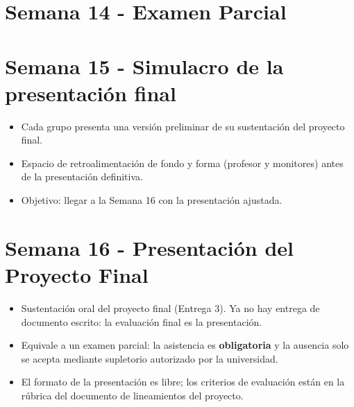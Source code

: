 \documentclass{article}
\begin{document}
\newpage
\section*{Semana 14 - Examen Parcial}

\newpage
\section*{Semana 15 - Simulacro de la presentación final}
\vspace{0.2 cm}

\begin{itemize}
  \item Cada grupo presenta una versión preliminar de su sustentación del proyecto final.
  \item Espacio de retroalimentación de fondo y forma (profesor y monitores) antes de la presentación definitiva.
  \item Objetivo: llegar a la Semana 16 con la presentación ajustada.
\end{itemize}

\newpage
\section*{Semana 16 - Presentación del Proyecto Final}
\vspace{0.2 cm}

\begin{itemize}
  \item Sustentación oral del proyecto final (Entrega 3). Ya no hay entrega de documento escrito: la evaluación final es la presentación.
  \item Equivale a un examen parcial: la asistencia es \textbf{obligatoria} y la ausencia solo se acepta mediante supletorio autorizado por la universidad.
  \item El formato de la presentación es libre; los criterios de evaluación están en la rúbrica del documento de lineamientos del proyecto.
\end{itemize}
\end{document}
